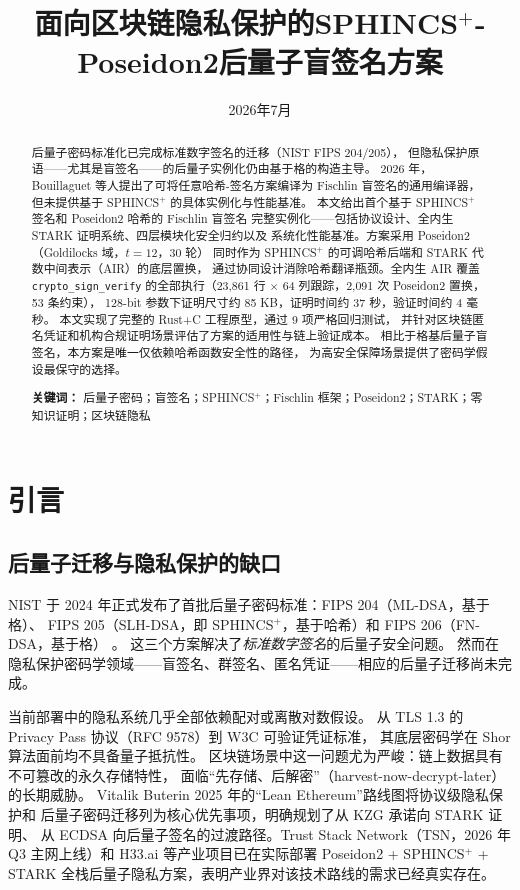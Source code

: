 \documentclass[11pt,a4paper]{ctexart}
\title{\textbf{面向区块链隐私保护的SPHINCS$^+$-Poseidon2后量子盲签名方案}}
\author{}
\date{2026年7月}
\begin{document}
\maketitle

\begin{abstract}
后量子密码标准化已完成标准数字签名的迁移（NIST FIPS 204/205），
但隐私保护原语——尤其是盲签名——的后量子实例化仍由基于格的构造主导。
2026 年，Bouillaguet 等人提出了可将任意哈希-签名方案编译为 Fischlin
盲签名的通用编译器，但未提供基于 SPHINCS$^+$ 的具体实例化与性能基准。
本文给出首个基于 SPHINCS$^+$ 签名和 Poseidon2 哈希的 Fischlin 盲签名
完整实例化——包括协议设计、全内生 STARK 证明系统、四层模块化安全归约以及
系统化性能基准。方案采用 Poseidon2（Goldilocks 域，$t=12$，30 轮）
同时作为 SPHINCS$^+$ 的可调哈希后端和 STARK 代数中间表示（AIR）的底层置换，
通过协同设计消除哈希翻译瓶颈。全内生 AIR 覆盖 \texttt{crypto\_sign\_verify}
的全部执行（23,861 行 $\times$ 64 列跟踪，2,091 次 Poseidon2 置换，53 条约束），
128-bit 参数下证明尺寸约 85 KB，证明时间约 37 秒，验证时间约 4 毫秒。
本文实现了完整的 Rust+C 工程原型，通过 9 项严格回归测试，
并针对区块链匿名凭证和机构合规证明场景评估了方案的适用性与链上验证成本。
相比于格基后量子盲签名，本方案是唯一仅依赖哈希函数安全性的路径，
为高安全保障场景提供了密码学假设最保守的选择。

\medskip
\noindent\textbf{关键词：}
后量子密码；盲签名；SPHINCS$^+$；Fischlin 框架；Poseidon2；STARK；零知识证明；区块链隐私
\end{abstract}

\section{引言}

\subsection{后量子迁移与隐私保护的缺口}

NIST 于 2024 年正式发布了首批后量子密码标准：FIPS 204（ML-DSA，基于格）、
FIPS 205（SLH-DSA，即 SPHINCS$^+$，基于哈希）和 FIPS 206（FN-DSA，基于格）
\cite{NIST2024FIPS205,NIST2022IR8413}。
这三个方案解决了\emph{标准数字签名}的后量子安全问题。
然而在隐私保护密码学领域——盲签名、群签名、匿名凭证——相应的后量子迁移尚未完成。

当前部署中的隐私系统几乎全部依赖配对或离散对数假设。
从 TLS 1.3 的 Privacy Pass 协议（RFC 9578）到 W3C 可验证凭证标准，
其底层密码学在 Shor 算法面前均不具备量子抵抗性。
区块链场景中这一问题尤为严峻：链上数据具有不可篡改的永久存储特性，
面临``先存储、后解密''（harvest-now-decrypt-later）的长期威胁。
Vitalik Buterin 2025 年的``Lean Ethereum''路线图将协议级隐私保护和
后量子密码迁移列为核心优先事项，明确规划了从 KZG 承诺向 STARK 证明、
从 ECDSA 向后量子签名的过渡路径。Trust Stack Network（TSN，2026 年 Q3
主网上线）和 H33.ai 等产业项目已在实际部署 Poseidon2 + SPHINCS$^+$ +
STARK 全栈后量子隐私方案，表明产业界对该技术路线的需求已经真实存在。
\end{document}
